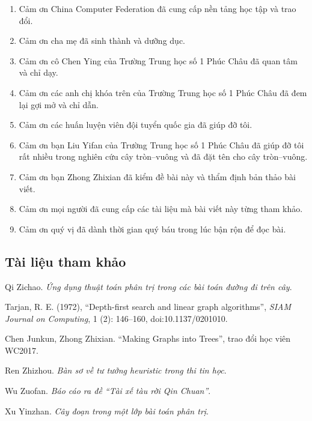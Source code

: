 \documentclass[11pt]{article}
\begin{document}
\begin{enumerate}
  \item Cảm ơn China Computer Federation đã cung cấp nền tảng học tập và trao
  đổi.

  \item Cảm ơn cha mẹ đã sinh thành và dưỡng dục.

  \item Cảm ơn cô Chen Ying của Trường Trung học số 1 Phúc Châu đã quan tâm và
  chỉ dạy.

  \item Cảm ơn các anh chị khóa trên của Trường Trung học số 1 Phúc Châu đã
  đem lại gợi mở và chỉ dẫn.

  \item Cảm ơn các huấn luyện viên đội tuyển quốc gia đã giúp đỡ tôi.

  \item Cảm ơn bạn Liu Yifan của Trường Trung học số 1 Phúc Châu đã giúp đỡ
  tôi rất nhiều trong nghiên cứu cây tròn--vuông và đã đặt tên cho cây
  tròn--vuông.

  \item Cảm ơn bạn Zhong Zhixian đã kiểm đề bài này và thẩm định bản thảo bài
  viết.

  \item Cảm ơn mọi người đã cung cấp các tài liệu mà bài viết này từng tham
  khảo.

  \item Cảm ơn quý vị đã dành thời gian quý báu trong lúc bận rộn để đọc bài.
\end{enumerate}

\subsection*{Tài liệu tham khảo}

\begin{enumerate}[label={[\arabic*]}]
  \item Qi Zichao. \emph{Ứng dụng thuật toán phân trị trong các bài toán đường
  đi trên cây}.

  \item Tarjan, R. E. (1972), ``Depth-first search and linear graph
  algorithms'', \emph{SIAM Journal on Computing}, 1 (2): 146--160,
  doi:10.1137/0201010.

  \item Chen Junkun, Zhong Zhixian. ``Making Graphs into Trees'', trao đổi học
  viên WC2017.

  \item Ren Zhizhou. \emph{Bàn sơ về tư tưởng heuristic trong thi tin học}.

  \item Wu Zuofan. \emph{Báo cáo ra đề ``Tài xế tàu rời Qin Chuan''}.

  \item Xu Yinzhan. \emph{Cây đoạn trong một lớp bài toán phân trị}.
\end{enumerate}
\end{document}
